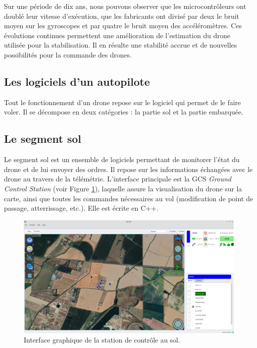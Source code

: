 Sur une période de dix ans, nous pouvons observer que les microcontrôleurs ont doublé leur vitesse d'exécution, que les fabricants ont divisé par deux le bruit moyen sur les gyroscopes et par quatre le bruit moyen des accéléromètres.
Ces évolutions continues permettent une amélioration de l'estimation du drone utilisée pour la stabilisation. Il en résulte une stabilité accrue et de nouvelles possibilités pour la commande des drones.

 \subsection*{Les logiciels d'un autopilote}
 Tout le fonctionnement d'un drone repose sur le logiciel qui permet de le faire voler. Il se décompose en deux catégories : la partie sol et la partie embarquée.

 \subsection*{Le segment sol}

Le segment sol est un ensemble de logiciels permettant de monitorer l'état du drone et de lui envoyer des ordres. Il repose sur les informations échangées avec le drone au travers de la télémétrie. L'interface principale est la GCS \textit{Ground Control Station} (voir Figure \ref{fig:GCS}), laquelle assure la visualisation du drone sur la carte, ainsi que toutes les commandes nécessaires au vol (modification de point de passage, atterrissage, etc.). Elle est écrite en C++.

\begin{figure}[ht!]
    \centerline{
    \includegraphics[trim=0cm 0cm 0cm 0cm,clip,width=0.8\columnwidth]{figures/GCS.png}}
    \caption{Interface graphique de la station de contrôle au sol.}
    \label{fig:GCS}
\end{figure}


